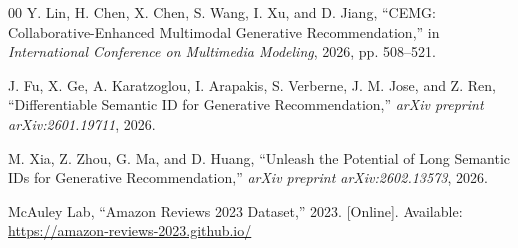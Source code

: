 \documentclass[conference]{IEEEtran}
\begin{document}
\begin{thebibliography}{00}
Y. Lin, H. Chen, X. Chen, S. Wang, I. Xu, and D. Jiang, ``CEMG: Collaborative-Enhanced Multimodal Generative Recommendation,'' in \emph{International Conference on Multimedia Modeling}, 2026, pp. 508--521.

J. Fu, X. Ge, A. Karatzoglou, I. Arapakis, S. Verberne, J. M. Jose, and Z. Ren, ``Differentiable Semantic ID for Generative Recommendation,'' \emph{arXiv preprint arXiv:2601.19711}, 2026.

M. Xia, Z. Zhou, G. Ma, and D. Huang, ``Unleash the Potential of Long Semantic IDs for Generative Recommendation,'' \emph{arXiv preprint arXiv:2602.13573}, 2026.

McAuley Lab, ``Amazon Reviews 2023 Dataset,'' 2023. [Online]. Available: \url{https://amazon-reviews-2023.github.io/}
\end{thebibliography}
\end{document}
